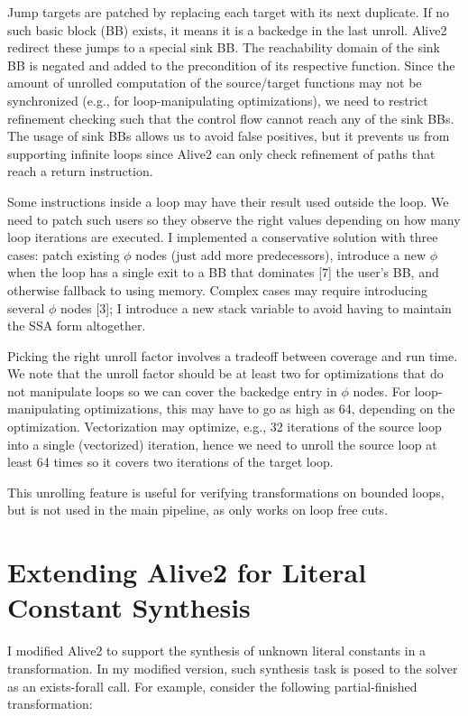 Jump targets are patched by replacing each target with its next
duplicate. If no such basic block (BB) exists, it means it is a
backedge in the last unroll. Alive2 redirect these jumps to a special
sink BB.
%
The reachability domain of the sink BB is negated and added to the
precondition of its respective function.
%
Since the amount of unrolled computation of the source/target
functions may not be synchronized (e.g., for loop-manipulating
optimizations), we need to restrict refinement checking such that the
control flow cannot reach any of the sink BBs.
%
The usage of sink BBs allows us to avoid false positives, but it
prevents us from supporting infinite loops since Alive2 can only check
refinement of paths that reach a return instruction.

Some instructions inside a loop may have their result used outside the
loop. We need to patch such users so they observe the right values
depending on how many loop iterations are executed.
%
I implemented a conservative solution with three cases: patch existing
$\phi$ nodes (just add more predecessors), introduce a new $\phi$ when
the loop has a single exit to a BB that dominates [7] the user’s BB,
and otherwise fallback to using memory.
%
Complex cases may require introducing several $\phi$ nodes [3]; I
introduce a new stack variable to avoid having to maintain the SSA
form altogether.


Picking the right unroll factor involves a tradeoff between coverage
and run time.
%
We note that the unroll factor should be at least two for
optimizations that do not manipulate loops so we can cover the
backedge entry in $\phi$ nodes.
%
For loop-manipulating optimizations, this may have to go as high as
64, depending on the optimization.
%
Vectorization may optimize, e.g., 32 iterations of the source loop
into a single (vectorized) iteration, hence we need to unroll the
source loop at least 64 times so it covers two iterations of the
target loop.

This unrolling feature is useful for verifying transformations on
bounded loops, but is not used in the main \minotaur{} pipeline, as
\minotaur{} only works on loop free cuts.

\section {Extending Alive2 for Literal Constant Synthesis}

I modified Alive2 to support the synthesis of unknown literal
constants in a transformation. In my modified version, such synthesis
task is posed to the solver as an exists-forall call.
%
For example, consider the following partial-finished transformation:

